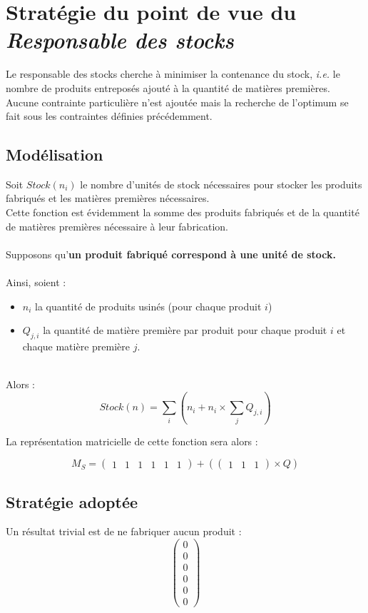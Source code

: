 \newpage
\section{Stratégie du point de vue du \textsl{Responsable des stocks}}
\label{stocks}

Le responsable des stocks cherche à minimiser la contenance du stock,
\textsl{i.e.} le nombre de produits entreposés ajouté à la quantité de
matières premières. Aucune contrainte particulière n'est ajoutée mais la
recherche de l'optimum se fait sous les contraintes définies précédemment.

\subsection{Modélisation}
Soit $Stock(n_{i})$ le nombre d'unités de stock nécessaires pour stocker les
produits fabriqués et les matières premières nécessaires.\\
Cette fonction est évidemment la somme des produits fabriqués et de la quantité de matières
premières nécessaire à leur fabrication.\\
~\\
Supposons qu'\textbf{un produit fabriqué correspond à une unité de stock.}\\
~\\
Ainsi, soient :
\begin{itemize}
	\item $n_{i}$ la quantité de produits usinés (pour chaque produit $i$)
	\item $Q_{j,i}$ la quantité de matière première par produit pour chaque produit $i$ et chaque matière première $j$.
\end{itemize}
~\\
Alors :
\begin{equation}
	Stock(n) = \sum_{i} (n_{i} + n_{i} \times \sum_{j} Q_{j,i})
\end{equation}

La représentation matricielle de cette fonction sera alors :

\begin{equation}
	M_S = \begin{pmatrix}
		1 & 1 & 1 & 1 & 1 & 1
	\end{pmatrix} + (
	\begin{pmatrix}
		1 & 1 & 1
	\end{pmatrix}
	\times Q)
\end{equation}

\subsection{Stratégie adoptée}
Un résultat trivial est de ne fabriquer aucun produit :
\begin{equation}
    \begin{pmatrix}
	0 \\ 0 \\ 0 \\ 0 \\ 0 \\ 0
    \end{pmatrix}
\end{equation}

